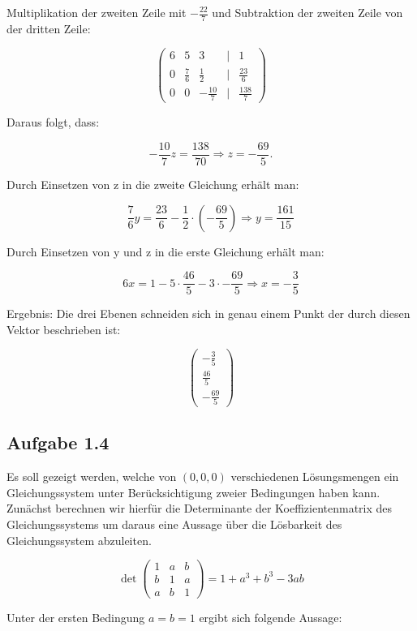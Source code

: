 \documentclass[11pt]{article}
\begin{document}
Multiplikation der zweiten Zeile mit $-\frac{22}{7}$ und Subtraktion der zweiten Zeile von der dritten Zeile:

\[
\begin{pmatrix}
    6 & 5 & 3 & | & 1 \\
    0 & \frac{7}{6} & \frac{1}{2} & | & \frac{23}{6} \\
    0 & 0 & -\frac{10}{7} & | & \frac{138}{7}
\end{pmatrix}
\]

Daraus folgt, dass:

\[
-\frac{10}{7}z = \frac{138}{70} \Rightarrow z= -\frac{69}{5}.
\]

Durch Einsetzen von z in die zweite Gleichung erhält man:

\[
\frac{7}{6}y = \frac{23}{6} - \frac{1}{2} \cdot \left(-\frac{69}{5}\right) \Rightarrow y = \frac{161}{15}
\]

Durch Einsetzen von y und z in die erste Gleichung erhält man:

\[
6x = 1 - 5 \cdot \frac{46}{5} - 3 \cdot -\frac{69}{5} \Rightarrow x = -\frac{3}{5}
\]

Ergebnis: Die drei Ebenen schneiden sich in genau einem Punkt der durch diesen Vektor beschrieben ist:

\[
\begin{pmatrix}
    -\frac{3}{5} \\
    \frac{46}{5} \\
    -\frac{69}{5}
\end{pmatrix}
\]

\subsection{Aufgabe 1.4}

Es soll gezeigt werden, welche von ${(0,0,0)}$ verschiedenen Lösungsmengen ein Gleichungssystem
unter Berücksichtigung zweier Bedingungen haben kann. Zunächst berechnen wir hierfür die Determinante der Koeffizientenmatrix des Gleichungssystems um daraus eine
Aussage über die Lösbarkeit des Gleichungssystem abzuleiten.

\[
\det\begin{pmatrix}
    1 & a & b \\
    b & 1 & a \\
    a & b & 1
\end{pmatrix} = 1 + a^3 + b^3 - 3ab
\]

Unter der ersten Bedingung $a = b = 1$ ergibt sich folgende Aussage:
\end{document}
